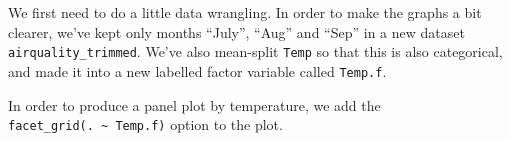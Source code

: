 \documentclass[]{article}
\newenvironment{Shaded}{\begin{snugshade}}{\end{snugshade}}
\newcommand{\KeywordTok}[1]{\textcolor[rgb]{0.13,0.29,0.53}{\textbf{{#1}}}}
\newcommand{\DataTypeTok}[1]{\textcolor[rgb]{0.13,0.29,0.53}{{#1}}}
\newcommand{\DecValTok}[1]{\textcolor[rgb]{0.00,0.00,0.81}{{#1}}}
\newcommand{\StringTok}[1]{\textcolor[rgb]{0.31,0.60,0.02}{{#1}}}
\newcommand{\NormalTok}[1]{{#1}}
\begin{document}
We first need to do a little data wrangling. In order to make the graphs
a bit clearer, we've kept only months ``July'', ``Aug'' and ``Sep'' in a
new dataset \texttt{airquality\_trimmed}. We've also mean-split
\texttt{Temp} so that this is also categorical, and made it into a new
labelled factor variable called \texttt{Temp.f}.

In order to produce a panel plot by temperature, we add the
\texttt{facet\_grid(.\ \textasciitilde{}\ Temp.f)} option to the plot.

\begin{Shaded}
\end{Shaded}
\end{document}
